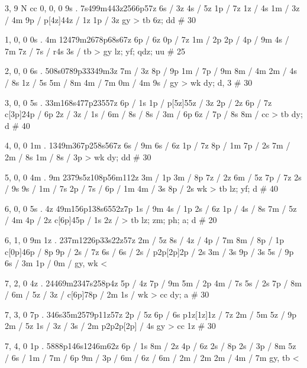 3, 9
N
cc
0, 0, 0
9s . 
7s499m443z2566p57z
6s / 3z 
4s / 5z 
1p / 7z 
1z / 4s 
1m / 
3z / 4m 
9p / 
p[4z]44z / 1z 
1p / 3z 
gy > tb 
6z; dd # 30 

1, 0, 0
0s . 4m 
12479m2678p68s67z 
6p / 6z 
0p / 7z 
1m / 2p 
2p / 
4p / 9m 
4s / 7m 
7z / 
7s / r4s 
3s / 
tb > gy 
lz; yf; qdz; uu # 25

2, 0, 0 
6s .
508s0789p33349m3z 
7m / 3z 
8p / 9p 
1m / 
7p / 9m 
8m / 4m 
2m / 
4s / 8s 
1z / 5s 
5m / 8m 
4m / 7m 
0m / 4m 
9s /  
gy > wk
dy; d, 3 # 30 

3, 0, 0
5s .
33m168s477p23557z 
6p / 1s 
1p / 
p[5z]55z / 3z 
2p / 2z 
6p / 7z 
c[3p]24p / 6p 
2z / 
3z / 
1s / 
6m / 
8s / 
8s / 
3m / 6p 
6z / 
7p / 8s 
8m / 
cc > tb 
dy; d # 40 

4, 0, 0 
1m . 
1349m367p258s567z 
6s / 9m 
6s / 6z 
1p / 7z 
8p / 1m 
7p / 2s 
7m / 
2m / 8s 
1m / 
8s / 3p 
> wk 
dy; dd # 30 

5, 0, 0 
4m . 9m 
2379s5z108p56m112z 
3m / 1p 
3m / 8p 
7z / 2z 
6m / 5z 
7p / 7z 
2s / 9s 
9s / 
1m / 7s 
2p / 
7s / 
6p / 1m 
4m / 3s 
8p / 2s 
wk > tb 
lz; yf; d # 40 

6, 0, 0
5s . 4z 
49m156p138s6552z7p 
1s / 9m 
4s / 1p 
2s / 6z 
1p / 
4s / 8s 
7m / 
5z / 4m 
4p / 2z
c[6p]45p / 1s 
2z / 
> tb 
lz; zm; ph; a; d # 20 

6, 1, 0 
9m 1z . 
237m1226p33s22z57z 
2m / 5z 
8s / 
4z / 
4p / 7m 
8m / 
8p / 1p 
c[0p]46p / 8p 
9p / 
2s / 7z 
6s / 
6s / 
2s / 
p2p[2p]2p / 2s 
3m / 3s 
9p / 3s 
5s / 9p 
6s / 3m 
1p / 
0m / 
gy, wk < 

7, 2, 0
4z . 
24469m2347s258p4z 
5p / 4z 
7p / 9m 
5m / 2p 
4m / 7s 
5s / 2s 
7p / 
8m / 
6m / 
5z / 
3z / 
c[6p]78p / 2m 
1s / 
wk > cc 
dy; a # 30 

7, 3, 0 
7p . 
346s35m2579p11z57z 
2p / 5z 
6p / 6s 
p1z[1z]1z / 7z 
2m / 5m 
5z / 9p 
2m / 5z 
1s / 
3z / 
3s / 2m 
p2p2p[2p] / 4s 
gy > cc 
1z # 30 

7, 4, 0 
1p . 
5888p146s1246m62z 
6p / 1s 
8m / 2z 
4p / 6z 
2s / 8p 
2s / 
3p / 8m 
5z / 
6s / 
1m / 
7m / 6p 
9m / 
3p / 
6m / 
6z / 
6m / 
2m / 2m 
2m / 
4m / 7m 
gy, tb <
